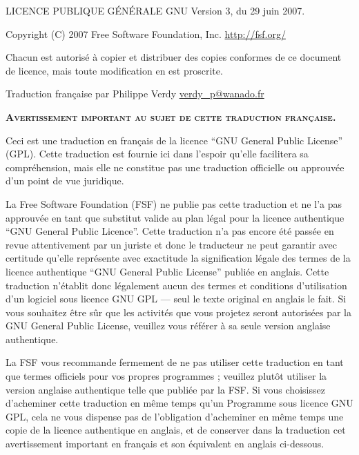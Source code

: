{\small
\begin{center}
		 LICENCE PUBLIQUE GÉNÉRALE GNU
                         Version 3, du 29 juin 2007.

\end{center}

Copyright (C) 2007 Free Software Foundation, Inc. \href{http://fsf.org/}{http://fsf.org/}

Chacun est autorisé à copier et distribuer des copies conformes de ce
document de licence, mais toute modification en est proscrite.

Traduction française par Philippe Verdy \href{mailto:verdy\_p@wanado.fr}{verdy\_p@wanado.fr}

\begin{center}
\textsc{\textbf{Avertissement important au sujet de cette traduction française.}}
\end{center}
Ceci est une traduction en français de la licence “GNU General Public
License” (GPL). Cette traduction est fournie ici dans l’espoir qu’elle
facilitera sa compréhension, mais elle ne constitue pas une traduction
officielle ou approuvée d’un point de vue juridique.

La Free Software Foundation (FSF) ne publie pas cette traduction et ne
l’a pas approuvée en tant que substitut valide au plan légal pour la
licence authentique “GNU General Public Licence”. Cette traduction n’a
pas encore été passée en revue attentivement par un juriste et donc le
traducteur ne peut garantir avec certitude qu’elle représente avec
exactitude la signification légale des termes de la licence authentique
“GNU General Public License” publiée en anglais. Cette traduction
n’établit donc légalement aucun des termes et conditions d’utilisation
d’un logiciel sous licence GNU GPL — seul le texte original en anglais
le fait. Si vous souhaitez être sûr que les activités que vous projetez
seront autorisées par la GNU General Public License, veuillez vous
référer à sa seule version anglaise authentique.

La FSF vous recommande fermement de ne pas utiliser cette traduction en
tant que termes officiels pour vos propres programmes ; veuillez plutôt
utiliser la version anglaise authentique telle que publiée par la FSF.
Si vous choisissez d’acheminer cette traduction en même temps qu’un
Programme sous licence GNU GPL, cela ne vous dispense pas de l’obligation
d’acheminer en même temps une copie de la licence authentique en anglais,
et de conserver dans la traduction cet avertissement important en
français et son équivalent en anglais ci-dessous.

}
